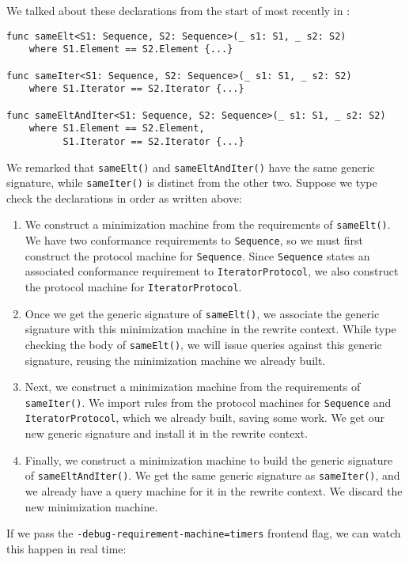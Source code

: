 \documentclass[../generics]{subfiles}
\begin{document}
\begin{example}
We talked about these declarations from the start of  most recently in :
\begin{Verbatim}
func sameElt<S1: Sequence, S2: Sequence>(_ s1: S1, _ s2: S2)
    where S1.Element == S2.Element {...}

func sameIter<S1: Sequence, S2: Sequence>(_ s1: S1, _ s2: S2)
    where S1.Iterator == S2.Iterator {...}

func sameEltAndIter<S1: Sequence, S2: Sequence>(_ s1: S1, _ s2: S2)
    where S1.Element == S2.Element,
          S1.Iterator == S2.Iterator {...}
\end{Verbatim}
We remarked that \texttt{sameElt()} and \texttt{sameEltAndIter()} have the same generic signature, while \texttt{sameIter()} is distinct from the other two. Suppose we type check the declarations in order as written above:
\begin{enumerate}
\item We construct a minimization machine from the requirements of \texttt{sameElt()}. We have two conformance requirements to \texttt{Sequence}, so we must first construct the protocol machine for \texttt{Sequence}. Since \texttt{Sequence} states an associated conformance requirement to \texttt{IteratorProtocol}, we also construct the protocol machine for \texttt{IteratorProtocol}.
\item Once we get the generic signature of \texttt{sameElt()}, we associate the generic signature with this minimization machine in the rewrite context. While type checking the body of \texttt{sameElt()}, we will issue queries against this generic signature, reusing the minimization machine we already built.
\item Next, we construct a minimization machine from the requirements of \texttt{sameIter()}. We import rules from the protocol machines for \texttt{Sequence} and \texttt{IteratorProtocol}, which we already built, saving some work. We get our new generic signature and install it in the rewrite context.
\item Finally, we construct a minimization machine to build the generic signature of \texttt{sameEltAndIter()}. We get the same generic signature as \texttt{sameIter()}, and we already have a query machine for it in the rewrite context. We discard the new minimization machine.
\end{enumerate}
If we pass the \texttt{-debug-requirement-machine=timers} frontend flag, we can watch this happen in real time:

\end{example}
\end{document}
